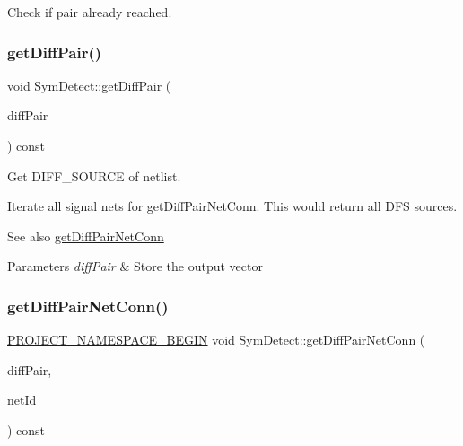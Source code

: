 Check if pair already reached. 

\mbox{\label{classSymDetect_af04b93dac7e090cef8e741d8d1812485}} 
\subsubsection{\texorpdfstring{get\+Diff\+Pair()}{getDiffPair()}}
{\footnotesize\ttfamily void Sym\+Detect\+::get\+Diff\+Pair (\begin{DoxyParamCaption}\item[{std\+::vector$<$ \hyperlink{structMosPair}{Mos\+Pair} $>$ \&}]{diff\+Pair }\end{DoxyParamCaption}) const\hspace{0.3cm}{\ttfamily [private]}}



Get D\+I\+F\+F\+\_\+\+S\+O\+U\+R\+CE of netlist. 

Iterate all signal nets for get\+Diff\+Pair\+Net\+Conn. This would return all D\+FS sources.

\begin{DoxySeeAlso}{See also}
\hyperlink{classSymDetect_acbcaf5319edd53b2b6cedaa5818bdd38}{get\+Diff\+Pair\+Net\+Conn} 
\end{DoxySeeAlso}

\begin{DoxyParams}{Parameters}
{\em diff\+Pair} & Store the output vector \\
\hline
\end{DoxyParams}
\mbox{\label{classSymDetect_acbcaf5319edd53b2b6cedaa5818bdd38}} 
\subsubsection{\texorpdfstring{get\+Diff\+Pair\+Net\+Conn()}{getDiffPairNetConn()}}
{\footnotesize\ttfamily \hyperlink{namespace_8h_ae48726a24dab2034454cf6d79e531eb8}{P\+R\+O\+J\+E\+C\+T\+\_\+\+N\+A\+M\+E\+S\+P\+A\+C\+E\+\_\+\+B\+E\+G\+IN} void Sym\+Detect\+::get\+Diff\+Pair\+Net\+Conn (\begin{DoxyParamCaption}\item[{std\+::vector$<$ \hyperlink{structMosPair}{Mos\+Pair} $>$ \&}]{diff\+Pair,  }\item[{\hyperlink{type_8h_a581e8093e28e7362f2b6937296190676}{Index\+Type}}]{net\+Id }\end{DoxyParamCaption}) const\hspace{0.3cm}{\ttfamily [private]}}



